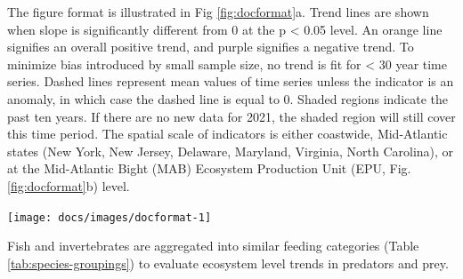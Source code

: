 \documentclass[
  10pt,
]{article}
\let\origfigure\figure
\let\endorigfigure\endfigure
\renewenvironment{figure}[1][2] {
    \expandafter\origfigure\expandafter[H]
} {
    \endorigfigure
}
\begin{document}
The figure format is illustrated in Fig \ref{fig:docformat}a. Trend
lines are shown when slope is significantly different from 0 at the p
\textless{} 0.05 level. An orange line signifies an overall positive
trend, and purple signifies a negative trend. To minimize bias
introduced by small sample size, no trend is fit for \textless{} 30 year
time series. Dashed lines represent mean values of time series unless
the indicator is an anomaly, in which case the dashed line is equal to
0. Shaded regions indicate the past ten years. If there are no new data
for 2021, the shaded region will still cover this time period. The
spatial scale of indicators is either coastwide, Mid-Atlantic states
(New York, New Jersey, Delaware, Maryland, Virginia, North Carolina), or
at the Mid-Atlantic Bight (MAB) Ecosystem Production Unit (EPU, Fig.
\ref{fig:docformat}b) level.

\begin{figure}

{\centering \texttt{[image: docs/images/docformat-1]} 

}

\caption{Document orientation. a. Key to figures. b.The Northeast Large Marine Ecosystem.}\label{fig:docformat}
\end{figure}

Fish and invertebrates are aggregated into similar feeding categories
(Table \ref{tab:species-groupings}) to evaluate ecosystem level trends
in predators and prey.
\end{document}
